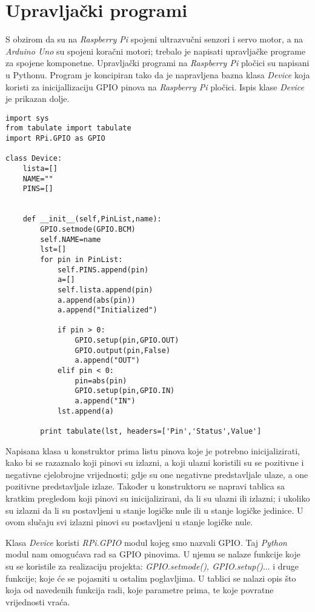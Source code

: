 \section{Upravljački programi}

S obzirom da su na \textit{Raspberry Pi} spojeni ultrazvučni senzori i servo motor, a na \textit{Arduino Uno} su spojeni koračni motori; trebalo je napisati upravljačke programe za spojene komponetne. Upravljački programi na \textit{Raspberry Pi} pločici su napisani u Pythonu. Program je koncipiran tako da je napravljena bazna klasa \textit{Device} koja koristi za inicijallizaciju GPIO pinova na \textit{Raspberry Pi} pločici. Ispis klase \textit{Device} je prikazan dolje.

\begin{lstlisting}[caption={Klasa \textit{Device}  (\textit{Raspberry Pi})}, xleftmargin=.75in, label=program]
import sys
from tabulate import tabulate
import RPi.GPIO as GPIO

class Device:
	lista=[]
	NAME=""
	PINS=[]


	def __init__(self,PinList,name):
		GPIO.setmode(GPIO.BCM)
		self.NAME=name
		lst=[]
		for pin in PinList:
			self.PINS.append(pin)
			a=[]
			self.lista.append(pin)
			a.append(abs(pin))
			a.append("Initialized")
			
			if pin > 0:
				GPIO.setup(pin,GPIO.OUT)
				GPIO.output(pin,False)
				a.append("OUT")
			elif pin < 0:
				pin=abs(pin)
				GPIO.setup(pin,GPIO.IN)
				a.append("IN")
			lst.append(a)
		
		print tabulate(lst, headers=['Pin','Status',Value']
\end{lstlisting}

Napisana klasa u konstruktor prima listu pinova koje je potrebno inicijalizirati, kako bi se razaznalo koji pinovi su izlazni, a koji ulazni koristili su se pozitivne i negativne cjelobrojne vrijednosti; gdje su one negativne predstavljale ulaze, a one pozitivne predstavljale izlaze. Također u konstruktoru se napravi tablica sa kratkim pregledom koji pinovi su inicijalizirani, da li su ulazni ili izlazni; i ukoliko su izlazni da li su postavljeni u stanje logičke nule ili u stanje logičke jedinice. U ovom slučaju svi izlazni pinovi su postavljeni u stanje logičke nule.

Klasa \textit{Device} koristi \textit{RPi.GPIO} modul kojeg smo nazvali GPIO. Taj \textit{Python} modul nam omogućava rad sa GPIO pinovima. U njemu se nalaze funkcije koje su se koristile za realizaciju projekta: \textit{GPIO.setmode(), GPIO.setup()}... i druge funkcije; koje će se pojasniti u ostalim poglavljima. U tablici se nalazi opis što koja od navedenih funkcija radi, koje parametre prima, te koje povratne vrijednosti vraća.

